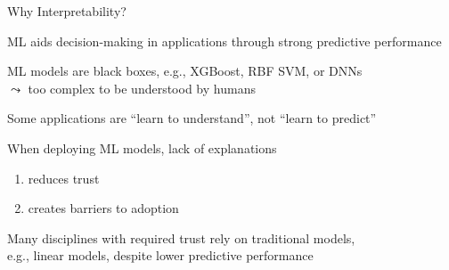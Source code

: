 \documentclass[10pt,compress,t,notes=noshow, xcolor=table]{beamer}
\begin{document}
\begin{framev}[align=top]{Why Interpretability?}
\begin{itemizeM}
\item ML aids decision-making in applications through strong predictive performance
\item ML models are black boxes, e.g., XGBoost, RBF SVM, or DNNs\\
$\leadsto$ too complex to be understood by humans
\item Some applications are ``learn to understand'', not ``learn to predict''
\item<2-> When deploying ML models, lack of explanations
\begin{enumerate}
\item reduces trust
\item creates barriers to adoption
\end{enumerate}
\item<2->[$\leadsto$] Many disciplines with required trust rely on traditional models,\\
e.g., linear models, despite lower predictive performance
\end{itemizeM}
\end{framev}
\end{document}
